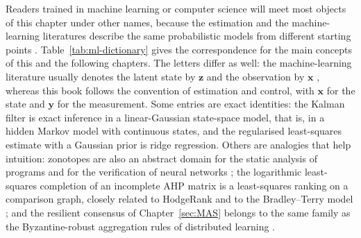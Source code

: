 \documentclass[graybox,envcountchap]{style/SNmono}
\begin{document}
Readers trained in machine learning or computer science will meet most objects of this chapter under other names, because the estimation and the machine-learning literatures describe the same probabilistic models from different starting points \cite{bishop2006_prml,koller2009_pgm,sarkka2013_bayesian}. Table~\ref{tab:ml-dictionary} gives the correspondence for the main concepts of this and the following chapters. The letters differ as well: the machine-learning literature usually denotes the latent state by $\mathbf{z}$ and the observation by $\mathbf{x}$ \cite{bishop2006_prml}, whereas this book follows the convention of estimation and control, with $\mathbf{x}$ for the state and $\mathbf{y}$ for the measurement. Some entries are exact identities: the Kalman filter is exact inference in a linear-Gaussian state-space model, that is, in a hidden Markov model with continuous states, and the regularised least-squares estimate with a Gaussian prior is ridge regression. Others are analogies that help intuition: zonotopes are also an abstract domain for the static analysis of programs and for the verification of neural networks \cite{ghorbal2009_zonotope,gehr2018_ai2}; the logarithmic least-squares completion of an incomplete AHP matrix is a least-squares ranking on a comparison graph, closely related to HodgeRank and to the Bradley--Terry model \cite{jiang2011_hodgerank,bradley1952_paired}; and the resilient consensus of Chapter~\ref{sec:MAS} belongs to the same family as the Byzantine-robust aggregation rules of distributed learning \cite{yin2018_byzantine}.
\end{document}
